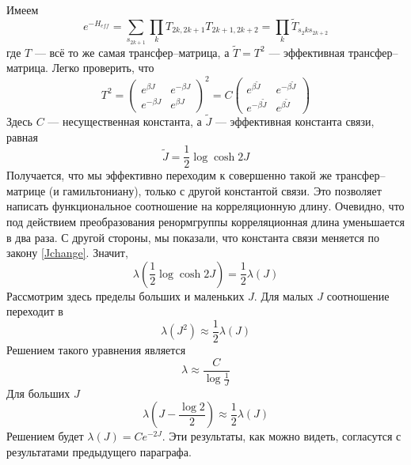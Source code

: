 \documentclass{article}
\begin{document}
		Имеем
		\begin{equation}
			e^{-H_{eff}} = \sum_{s_{2k+1}} \prod_k T_{2k, 2k+1} T_{2k+1, 2k+2} = 
					\prod_k \widetilde{T}_{s_2k s_{2k+2}} 
		\end{equation}
		где $T$ --- всё то же самая трансфер--матрица, 
		а $\widetilde{T} = T^2$ --- эффективная
		трансфер--матрица.
		Легко проверить, что
		\begin{equation}
			T^2 =
			\left (
			\begin{matrix}
				e^{\beta J} & e^{-\beta J} \\
				e^{-\beta J} & e^{\beta J}
			\end{matrix}
			\right )^2 = 
			C\left (
			\begin{matrix}
				e^{ \beta \widetilde{J}} & e^{-\beta \widetilde{J}} \\
				e^{-\beta \widetilde{J}} & e^{ \beta \widetilde{J}}
			\end{matrix}
			\right )
		\end{equation}
		Здесь $C$ --- несущественная константа, а $\widetilde{J}$ --- эффективная константа
		связи, равная
		\begin{equation}
			\label{Jchange}
			\widetilde{J} = \frac{1}{2} \log \cosh{2J}
		\end{equation}
		Получается, что мы эффективно переходим к совершенно такой же трансфер--матрице (и
		гамильтониану), только с другой константой связи. 
		Это позволяет написать функциональное соотношение на корреляционную длину. Очевидно,
		что под действием преобразования ренормгруппы корреляционная длина уменьшается в два 
		раза. С другой стороны, мы показали, что константа связи меняется по 
		закону \ref{Jchange}.
		Значит,
		\begin{equation}
			\lambda\left(\frac{1}{2} \log \cosh{2J}\right) = \frac{1}{2} \lambda(J)
		\end{equation}
		Рассмотрим здесь пределы больших и маленьких $J$.
		Для малых $J$ соотношение переходит в 
		\begin{equation}
			\lambda(J^2) \approx \frac{1}{2}\lambda(J)
		\end{equation}
		Решением такого уравнения является
		\begin{equation}
			\lambda  \approx \frac{C}{\log{\frac{1}{J}}}
		\end{equation}
		Для больших $J$ 
		\begin{equation}
			\lambda\left(J - \frac{\log2}{2}\right) \approx \frac12 \lambda(J)
		\end{equation}
		Решением будет $\lambda(J) = Ce^{-2J}$.
		Эти результаты, как можно видеть, согласутся с результатами предыдущего параграфа.
\end{document}
